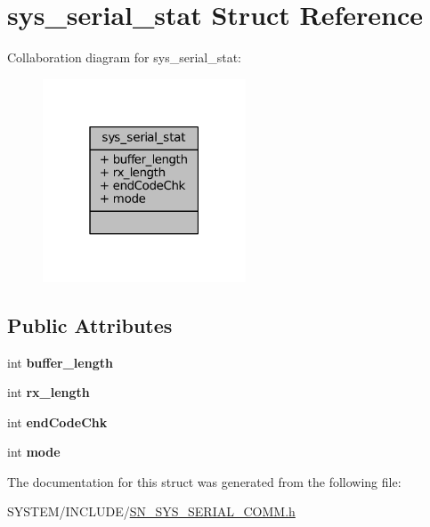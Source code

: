 \hypertarget{structsys__serial__stat}{}\section{sys\+\_\+serial\+\_\+stat Struct Reference}
\label{structsys__serial__stat}


Collaboration diagram for sys\+\_\+serial\+\_\+stat\+:\nopagebreak
\begin{figure}[H]
\begin{center}
\leavevmode
\includegraphics[width=171pt]{structsys__serial__stat__coll__graph}
\end{center}
\end{figure}
\subsection*{Public Attributes}
\begin{DoxyCompactItemize}
\item 
\mbox{\label{structsys__serial__stat_a3d41d5f40054f7865fda4e3a62cd0458}} 
int {\bfseries buffer\+\_\+length}
\item 
\mbox{\label{structsys__serial__stat_a5a47b12c036ae8a91b3cc5e68d07e7df}} 
int {\bfseries rx\+\_\+length}
\item 
\mbox{\label{structsys__serial__stat_a6ed1191e8a692ae484461be4978fb0d9}} 
int {\bfseries end\+Code\+Chk}
\item 
\mbox{\label{structsys__serial__stat_a9a214ec3cb825751b3812b4cd09e0f4a}} 
int {\bfseries mode}
\end{DoxyCompactItemize}


The documentation for this struct was generated from the following file\+:\begin{DoxyCompactItemize}
\item 
S\+Y\+S\+T\+E\+M/\+I\+N\+C\+L\+U\+D\+E/\hyperlink{SN__SYS__SERIAL__COMM_8h}{S\+N\+\_\+\+S\+Y\+S\+\_\+\+S\+E\+R\+I\+A\+L\+\_\+\+C\+O\+M\+M.\+h}\end{DoxyCompactItemize}
